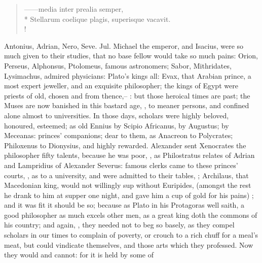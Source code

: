 \begin{latin}
\begin{verse}%
------media inter prealia semper,\\*
Stellarum coelique plagis, superisque vacavit.\\!
\end{verse}%
\end{latin}

Antonius, Adrian, Nero, Seve. Jul. \etc{}
Michael the emperor, and Isacius, were so much given to
their studies, that no base fellow would take so much pains: Orion, Perseus,
Alphonsus, Ptolomeus, famous astronomers; Sabor, Mithridates, Lysimachus,
admired physicians: Plato's kings all: Evax, that Arabian prince, a most expert
jeweller, and an exquisite philosopher; the kings of Egypt were priests of old,
chosen and from thence,-- : but those
heroical times are past; the Muses are now banished in this bastard age, , to meaner persons, and confined alone almost to
universities. In those days, scholars were highly beloved,
honoured, esteemed; as old Ennius by Scipio Africanus,
\Virgil{} by Augustus; \Horace{} by Meceanas: princes' companions; dear to them, as
Anacreon to Polycrates; Philoxenus to Dionysius, and highly rewarded. Alexander
sent Xenocrates the philosopher fifty talents, because he was poor, , as
Philostratus relates of Adrian and Lampridius of Alexander Severus: famous
clerks came to these princes' courts, , as to a
university, and were admitted to their tables, ; Archilaus, that Macedonian king, would not willingly sup without
Euripides, (amongst the rest he drank to him at supper one night, and gave him
a cup of gold for his pains) ; and it was
fit it should be so; because as Plato in his Protagoras
well saith, a good philosopher as much excels other men, as a great king doth
the commons of his country; and again, , they needed not to beg so basely, as they compel
scholars in our times to complain of poverty, or crouch to
a rich chuff for a meal's meat, but could vindicate themselves, and those arts
which they professed. Now they would and cannot: for it is held by some of
